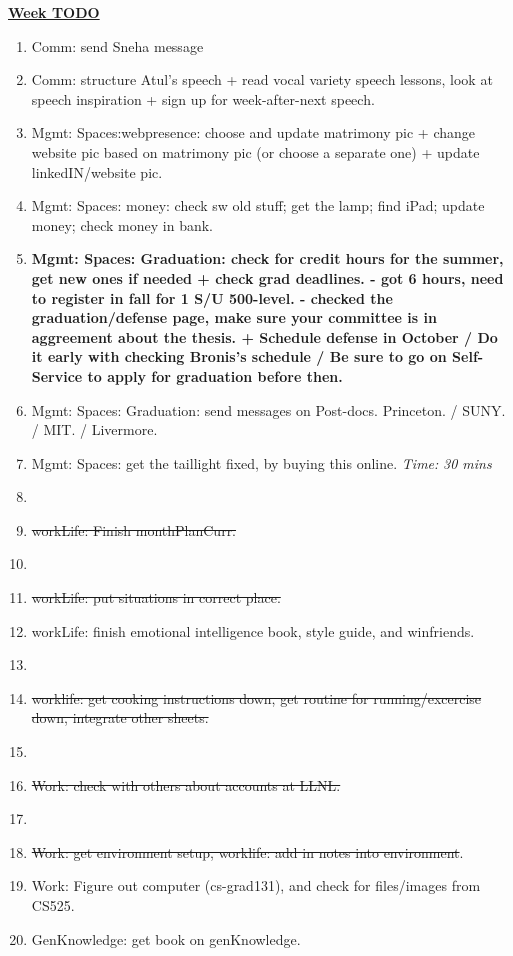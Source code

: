 \documentclass[serif,mathserif,final]{beamer}
\newcommand{\doneTask}[1]{\item \sout{#1}}
\newcommand{\timeEst}[1]{\textit{Time:} \textit{#1}}
\begin{document}
\begin{frame}{}
\begin{columns}[t]
\begin{column}{0.33\linewidth}{\textbf{\underline{Week TODO}}}
\begin{block}
\begin{enumerate}
\item \tiny Comm: send Sneha message 
\item \tiny Comm: structure Atul's speech + read vocal variety speech lessons, look at speech inspiration + sign up for week-after-next speech. 

\item \tiny Mgmt: Spaces:webpresence: choose and update matrimony pic
  + change website pic based on matrimony pic (or choose a separate
  one) + update linkedIN/website pic.


\item \tiny Mgmt: Spaces: money: check sw old stuff; get the lamp;
  find iPad; update money; check money in bank. 

\item \tiny \textbf{Mgmt: Spaces: Graduation: check for credit hours
  for the summer, get new ones if needed + check grad deadlines.  -
  got 6 hours,  need to register in fall for 1 S/U 500-level.  -
  checked the graduation/defense page, make sure your committee is in
  aggreement about the thesis. + Schedule defense in October / Do it
  early with checking Bronis's schedule / Be sure to go on
  Self-Service to apply for graduation before then. } 

\item \tiny Mgmt: Spaces: Graduation: send messages on Post-docs. Princeton. / SUNY. / MIT. / Livermore. 

\item \tiny Mgmt: Spaces: get the taillight fixed, by buying this online. \timeEst{30 mins} 

\item \tiny \doneTask{workLife: Finish monthPlanCurr.} 
\item \tiny \doneTask{workLife: put situations in correct place.}  
\item \tiny workLife: finish emotional intelligence book, style guide, and winfriends. 
\item \tiny \doneTask{worklife: get cooking instructions down, get routine for running/excercise down, integrate other sheets.} 



\item \tiny \doneTask{Work: check with others about accounts at LLNL. }
\item \tiny \doneTask{Work: get environment setup, worklife: add in notes into environment}. 
\item \tiny Work: Figure out computer (cs-grad131), and check for files/images from CS525. 
\item \tiny GenKnowledge: get book on genKnowledge. 
\end{enumerate}


\end{block}
\end{column}
\end{columns}
\end{frame}
\end{document}
